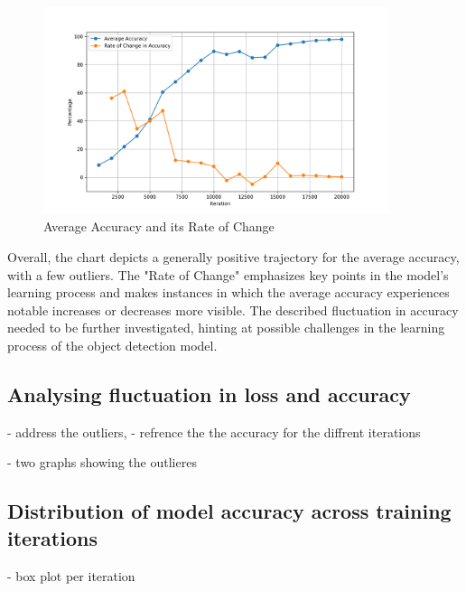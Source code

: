 \begin{figure}[h]
   \centering
   \includegraphics[width=0.9\textwidth]{../Data/accuracy-improvement-graph.png}
   \caption{Average Accuracy and its Rate of Change}
   \label{fig:accuracy-improvement}
\end{figure}

Overall, the chart depicts a generally positive trajectory for the average accuracy, with a few outliers. The "Rate of Change" emphasizes
key points in the model's learning process and makes instances in which the average accuracy experiences notable increases or decreases more
visible. The described fluctuation in accuracy needed to be further investigated, hinting at possible
challenges in the learning process of the object detection model. \\

\subsection{Analysing fluctuation in loss and accuracy}
- address the outliers, 
- refrence the the accuracy for the diffrent iterations 

- two graphs showing the outlieres

\subsection{Distribution of model accuracy across training iterations}
- box plot per iteration 






